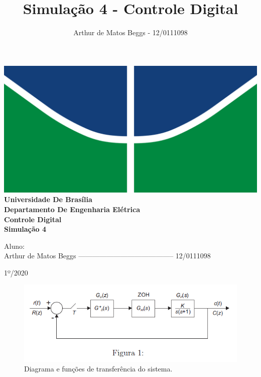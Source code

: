 \documentclass{article}
\title{Simulação 4 - Controle Digital}
\author{Arthur de Matos Beggs - 12/0111098}
\date{}
\begin{document}

\begin{titlepage}
    \begin{center}
        \centering
        \includegraphics[width=1\linewidth]{images/LogoUnB.png}\\[1cm]
        {\large \textbf{Universidade De Brasília}}\\[0.2cm]
        {\large \textbf{Departamento De Engenharia Elétrica}}\\[0.2cm]
        {\large \textbf{Controle Digital}}\\[5.1cm]
        {\bf \huge Simulação 4}\\[5.1cm]
    \end{center}
{\large Aluno: \\    Arthur de Matos Beggs ----------------------------------------- 12/0111098 }
\vspace{7mm}
    \begin{center}
        {\large 1º/2020}
    \end{center}
\end{titlepage}

\clearpage %

\setcounter{page}{2}

    \begin{figure}[H]
       \centering
            \includegraphics[width=1\linewidth]{images/Diagrama.png}
            \caption{Diagrama e funções de transferência do sistema.}
            \label{fig:diagram}
    \end{figure}
\end{document}
